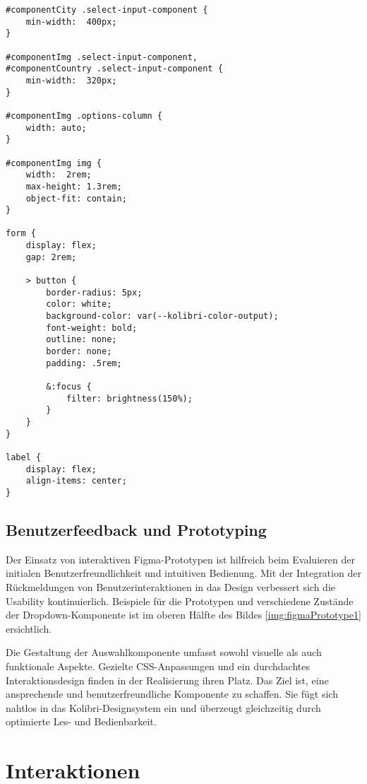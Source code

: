 \begin{lstlisting}[style = htmlcssjs, caption = Flexible Layouts für Demo-Page, label = code:layoutDemoPage]
#componentCity .select-input-component {
    min-width:  400px;
}

#componentImg .select-input-component,
#componentCountry .select-input-component {
    min-width:  320px;
}

#componentImg .options-column {
    width: auto;
}

#componentImg img {
    width:  2rem;
    max-height: 1.3rem;
    object-fit: contain;
}

form {
    display: flex;
    gap: 2rem;

    > button {
        border-radius: 5px;
        color: white;
        background-color: var(--kolibri-color-output);
        font-weight: bold;
        outline: none;
        border: none;
        padding: .5rem;

        &:focus {
            filter: brightness(150%);
        }
    }
}

label {
    display: flex;
    align-items: center;
}
\end{lstlisting}


\subsection{Benutzerfeedback und Prototyping}
\label{sec:userFeedbackPtototyping}

Der Einsatz von interaktiven Figma-Prototypen ist hilfreich beim Evaluieren der initialen Benutzerfreundlichkeit und intuitiven Bedienung. 
Mit der Integration der Rückmeldungen von Benutzerinteraktionen in das Design verbessert sich die Usability kontinuierlich.
Beispiele für die Prototypen und verschiedene Zustände der Dropdown-Komponente ist im oberen Hälfte des Bildes \ref{img:figmaPrototype1} ersichtlich.

Die Gestaltung der Auswahlkomponente umfasst sowohl visuelle als auch funktionale Aspekte. 
Gezielte CSS-Anpassungen und ein durchdachtes Interaktionsdesign finden in der Realisierung ihren Platz. 
Das Ziel ist, eine ansprechende und benutzerfreundliche Komponente zu schaffen. 
Sie fügt sich nahtlos in das Kolibri-Designsystem ein und überzeugt gleichzeitig durch optimierte Les- und Bedienbarkeit.

\section{Interaktionen}
\label{sec:interaction}

